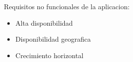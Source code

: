 
Requisitos no funcionales de la aplicacion:

\begin{itemize}
    \item Alta disponibilidad
    \item Disponibilidad geografica
    \item Crecimiento horizontal
\end{itemize}
